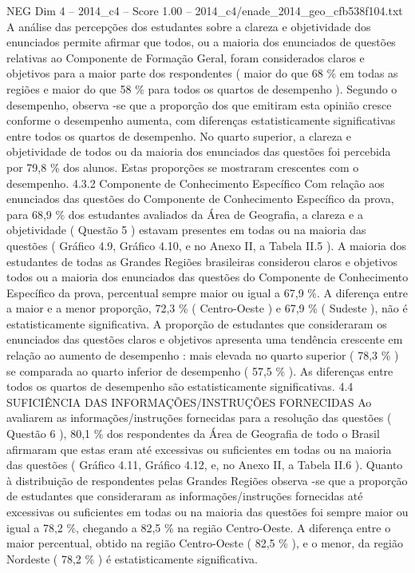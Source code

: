 \begin{textsample}{NEG Dim 4 – 2014\_c4 – Score 1.00 – 2014\_c4/enade\_2014\_geo\_cfb538f104.txt}
A análise das percepções dos estudantes sobre a clareza e objetividade dos enunciados permite afirmar que todos, ou a maioria dos enunciados de questões relativas ao Componente de Formação Geral, foram considerados claros e objetivos para a maior parte dos respondentes ( maior do que 68 \% em todas as regiões e maior do que 58 \% para todos os quartos de desempenho ).
Segundo o desempenho, observa -se que a proporção dos que emitiram esta opinião cresce conforme o desempenho aumenta, com diferenças estatisticamente significativas entre todos os quartos de desempenho.
No quarto superior, a clareza e objetividade de todos ou da maioria dos enunciados das questões foi percebida por 79,8 \% dos alunos.
Estas proporções se mostraram crescentes com o desempenho. 4.3.2 Componente de Conhecimento Específico Com relação aos enunciados das questões do Componente de Conhecimento Específico da prova, para 68,9 \% dos estudantes avaliados da Área de Geografia, a clareza e a objetividade ( Questão 5 ) estavam presentes em todas ou na maioria das questões ( Gráfico 4.9, Gráfico 4.10, e no Anexo II, a Tabela II.5 ).
A maioria dos estudantes de todas as Grandes Regiões brasileiras considerou claros e objetivos todos ou a maioria dos enunciados das questões do Componente de Conhecimento Específico da prova, percentual sempre maior ou igual a 67,9 \%.
A diferença entre a maior e a menor proporção, 72,3 \% ( Centro-Oeste ) e 67,9 \% ( Sudeste ), não é estatisticamente significativa.
A proporção de estudantes que consideraram os enunciados das questões claros e objetivos apresenta uma tendência crescente em relação ao aumento de desempenho : mais elevada no quarto superior ( 78,3 \% ) se comparada ao quarto inferior de desempenho ( 57,5 \% ).
As diferenças entre todos os quartos de desempenho são estatisticamente significativas. 4.4 SUFICIÊNCIA DAS INFORMAÇÕES/INSTRUÇÕES FORNECIDAS Ao avaliarem as informações/instruções fornecidas para a resolução das questões ( Questão 6 ), 80,1 \% dos respondentes da Área de Geografia de todo o Brasil afirmaram que estas eram até excessivas ou suficientes em todas ou na maioria das questões ( Gráfico 4.11, Gráfico 4.12, e, no Anexo II, a Tabela II.6 ).
Quanto à distribuição de respondentes pelas Grandes Regiões observa -se que a proporção de estudantes que consideraram as informações/instruções fornecidas até excessivas ou suficientes em todas ou na maioria das questões foi sempre maior ou igual a 78,2 \%, chegando a 82,5 \% na região Centro-Oeste.
A diferença entre o maior percentual, obtido na região Centro-Oeste ( 82,5 \% ), e o menor, da região Nordeste ( 78,2 \% ) é estatisticamente significativa.

\end{textsample}
